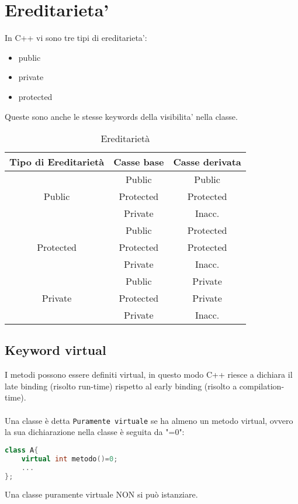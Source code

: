 \section{Ereditarieta’}
In C++ vi sono tre tipi di ereditarieta’:

\begin{itemize}
    \item public
    \item private
    \item protected
\end{itemize}
Queste sono anche le stesse keywords della visibilita’ nella classe.

\begin{table}[ht]
\caption{Ereditarietà}
\begin{center}
\begin{tabular}{c|c|c}
    Tipo di Ereditarietà &Casse base& Casse derivata\\
    \hline
    \multirow{3}{*}{Public}     &Public&Public\\
                                &Protected&Protected\\
                                &Private&Inacc.\\
    \hline

    \multirow{3}{*}{Protected}     &Public&Protected\\
                                &Protected&Protected\\
                                &Private&Inacc.\\
    \hline
    \multirow{3}{*}{Private}     &Public&Private\\
                                &Protected&Private\\
                                &Private&Inacc.\\
    \hline
\end{tabular}
\end{center}
\label{tab:multicol}
\end{table}

\subsection{Keyword virtual}
I metodi possono essere definiti virtual, in questo modo C++ riesce a dichiara il late binding (risolto run-time) rispetto al early binding (risolto a compilation-time).
\paragraph{}
Una classe è detta \verb|Puramente virtuale| se ha almeno un metodo virtual, ovvero la sua dichiarazione nella classe è seguita da "=0":

\begin{lstlisting}[language=c++]
class A{ 
    virtual int metodo()=0;
    ...
};
\end{lstlisting}

Una classe puramente virtuale NON si può istanziare.